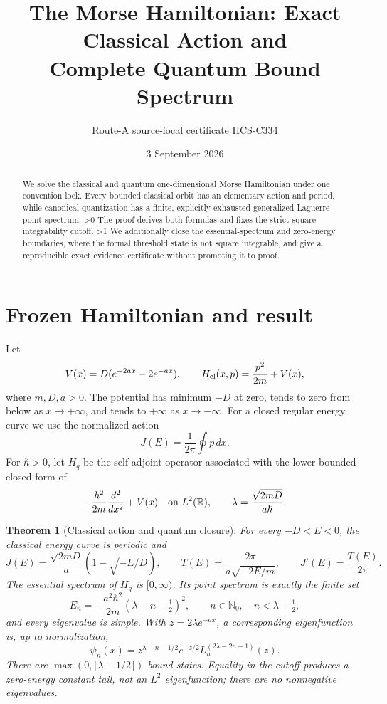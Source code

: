\documentclass[10pt]{article}
\title{The Morse Hamiltonian: Exact Classical Action and\\Complete Quantum Bound Spectrum}
\author{Route-A source-local certificate HCS-C334}
\date{3 September 2026}
\providecommand{\CRevisionRound}{2}
\newtheorem{theorem}{Theorem}
\newcommand{\R}{\mathbb R}
\begin{document}
\maketitle
\begin{abstract}
We solve the classical and quantum one-dimensional Morse Hamiltonian under
one convention lock.  Every bounded classical orbit has an elementary
action and period, while canonical quantization has a finite, explicitly
exhausted generalized-Laguerre point spectrum.
\ifnum\CRevisionRound>0
The proof derives both formulas and fixes the strict square-integrability
cutoff.
\fi
\ifnum\CRevisionRound>1
We additionally close the essential-spectrum and zero-energy boundaries,
where the formal threshold state is not square integrable, and give a
reproducible exact evidence certificate without promoting it to proof.
\fi
\end{abstract}

\section{Frozen Hamiltonian and result}
Let
\begin{equation}\label{eq:model}
 V(x)=D(e^{-2ax}-2e^{-ax}),\qquad
 H_{\rm cl}(x,p)=\frac{p^2}{2m}+V(x),
\end{equation}
where $m,D,a>0$.  The potential has minimum $-D$ at zero, tends to zero
from below as $x\to+\infty$, and tends to $+\infty$ as $x\to-\infty$.
For a closed regular energy curve we use the normalized action
\begin{equation}\label{eq:actiondef}
 J(E)=\frac{1}{2\pi}\oint p\,dx.
\end{equation}
For $\hbar>0$, let $H_q$ be the self-adjoint operator associated with the
lower-bounded closed form of
\[
 -\frac{\hbar^2}{2m}\frac{d^2}{dx^2}+V(x)
 \quad\hbox{on }L^2(\R),
 \qquad \lambda=\frac{\sqrt{2mD}}{a\hbar}.
\]

\begin{theorem}[Classical action and quantum closure]\label{thm:main}
For every $-D<E<0$, the classical energy curve is periodic and
\begin{equation}\label{eq:JT}
 J(E)=\frac{\sqrt{2mD}}a\left(1-\sqrt{-E/D}\right),\qquad
 T(E)=\frac{2\pi}{a\sqrt{-2E/m}},\qquad
 J'(E)=\frac{T(E)}{2\pi}.
\end{equation}
The essential spectrum of $H_q$ is $[0,\infty)$.  Its point spectrum is
exactly the finite set
\begin{equation}\label{eq:levels}
 E_n=-\frac{a^2\hbar^2}{2m}(\lambda-n-\tfrac12)^2,\qquad
 n\in\mathbb N_0,\quad n<\lambda-\tfrac12,
\end{equation}
and every eigenvalue is simple.  With $z=2\lambda e^{-ax}$, a corresponding
eigenfunction is, up to normalization,
\begin{equation}\label{eq:eigenfunction}
 \psi_n(x)=z^{\lambda-n-1/2}e^{-z/2}
 L_n^{(2\lambda-2n-1)}(z).
\end{equation}
There are $\max(0,\lceil\lambda-1/2\rceil)$ bound states.  Equality in the
cutoff produces a zero-energy constant tail, not an $L^2$ eigenfunction;
there are no nonnegative eigenvalues.
\end{theorem}
\end{document}
